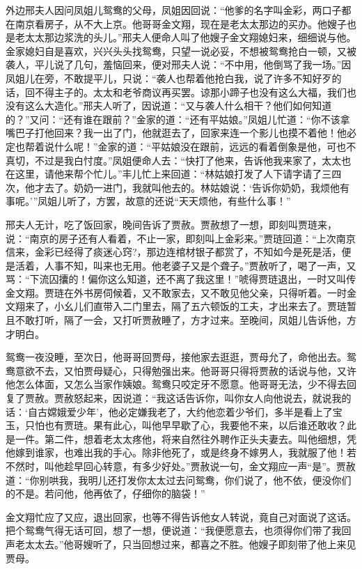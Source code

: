 \documentclass[12pt,oneside]{book}
\begin{document}
外边邢夫人因问凤姐儿鸳鸯的父母，凤姐因回说：“他爹的名字叫金彩，两口子都在南京看房子，从不大上京。他哥哥金文翔，现在是老太太那边的买办。他嫂子也是老太太那边浆洗的头儿。”邢夫人便命人叫了他嫂子金文翔媳妇来，细细说与他。金家媳妇自是喜欢，兴兴头头找鸳鸯，只望一说必妥，不想被鸳鸯抢白一顿，又被袭人，平儿说了几句，羞恼回来，便对邢夫人说：“不中用，他倒骂了我一场。”因凤姐儿在旁，不敢提平儿，只说：“袭人也帮着他抢白我，说了许多不知好歹的话，回不得主子的。太太和老爷商议再买罢。谅那小蹄子也没有这么大福，我们也没有这么大造化。”邢夫人听了，因说道：“又与袭人什么相干？他们如何知道的？”又问：“还有谁在跟前？”金家的道：“还有平姑娘。”凤姐儿忙道：“你不该拿嘴巴子打他回来？我一出了门，他就逛去了，回家来连一个影儿也摸不着他！他必定也帮着说什么呢！”金家的道：“平姑娘没在跟前，远远的看着倒象是他，可也不真切，不过是我白忖度。”凤姐便命人去：“快打了他来，告诉他我来家了，太太也在这里，请他来帮个忙儿。”丰儿忙上来回道：“林姑娘打发了人下请字请了三四次，他才去了。奶奶一进门，我就叫他去的。林姑娘说：‘告诉你奶奶，我烦他有事呢。’”凤姐儿听了，方罢，故意的还说“天天烦他，有些什么事！”

邢夫人无计，吃了饭回家，晚间告诉了贾赦。贾赦想了一想，即刻叫贾琏来，说：“南京的房子还有人看着，不止一家，即刻叫上金彩来。”贾琏回道：“上次南京信来，金彩已经得了痰迷心窍?，那边连棺材银子都赏了，不知如今是死是活，便是活着，人事不知，叫来也无用。他老婆子又是个聋子。”贾赦听了，喝了一声，又骂：“下流囚攮的！偏你这么知道，还不离了我这里！”唬得贾琏退出，一时又叫传金文翔。贾琏在外书房伺候着，又不敢家去，又不敢见他父亲，只得听着。一时金文翔来了，小幺儿们直带入二门里去，隔了五六顿饭的工夫，才出来去了。贾琏暂且不敢打听，隔了一会，又打听贾赦睡了，方才过来。至晚间，凤姐儿告诉他，方才明白。

鸳鸯一夜没睡，至次日，他哥哥回贾母，接他家去逛逛，贾母允了，命他出去。鸳鸯意欲不去，又怕贾母疑心，只得勉强出来。他哥哥只得将贾赦的话说与他，又许他怎么体面，又怎么当家作姨娘。鸳鸯只咬定牙不愿意。他哥哥无法，少不得去回复了贾赦。贾赦怒起来，因说道：“我这话告诉你，叫你女人向他说去，就说我的话：‘自古嫦娥爱少年’，他必定嫌我老了，大约他恋着少爷们，多半是看上了宝玉，只怕也有贾琏。果有此心，叫他早早歇了心，我要他不来，以后谁还敢收？此是一件。第二件，想着老太太疼他，将来自然往外聘作正头夫妻去。叫他细想，凭他嫁到谁家，也难出我的手心。除非他死了，或是终身不嫁男人，我就服了他！若不然时，叫他趁早回心转意，有多少好处。”贾赦说一句，金文翔应一声“是”。贾赦道：“你别哄我，我明儿还打发你太太过去问鸳鸯，你们说了，他不依，便没你们的不是。若问他，他再依了，仔细你的脑袋！”

金文翔忙应了又应，退出回家，也等不得告诉他女人转说，竟自己对面说了这话。把个鸳鸯气得无话可回，想了一想，便说道：“我便愿意去，也须得你们带了我回声老太太去。”他哥嫂听了，只当回想过来，都喜之不胜。他嫂子即刻带了他上来见贾母。
\end{document}
